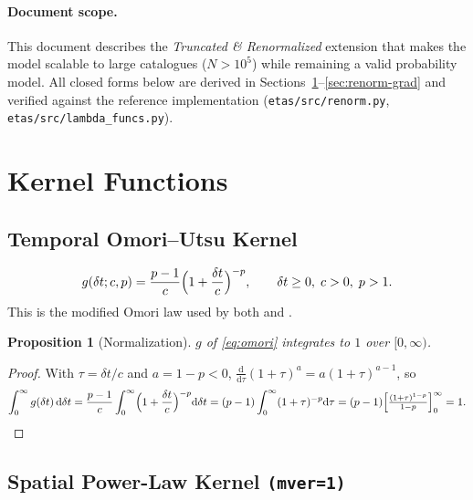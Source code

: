 \documentclass[11pt,a4paper]{article}
\theoremstyle{plain}
\newtheorem{proposition}{Proposition}
\theoremstyle{definition}
\newcommand{\dt}{\delta t}
\newcommand{\dd}{\mathrm{d}}
\begin{document}
\paragraph{Document scope.}
This document describes the \emph{Truncated \& Renormalized} extension that
makes the model scalable to large catalogues ($N>10^5$) while remaining a
valid probability model. All closed forms below are derived in
Sections~\ref{sec:kernels}--\ref{sec:renorm-grad} and verified against the
reference implementation (\texttt{etas/src/renorm.py},
\texttt{etas/src/lambda\_funcs.py}).

\section{Kernel Functions}\label{sec:kernels}

\subsection{Temporal Omori--Utsu Kernel}\label{sec:omori}

\begin{equation}\label{eq:omori}
g(\dt; c,p) = \frac{p-1}{c}\Bigl(1+\frac{\dt}{c}\Bigr)^{-p},
\qquad \dt\ge 0,\; c>0,\; p>1.
\end{equation}
This is the modified Omori law used by both \cite{J19} and \cite{GZZ15}.

\begin{proposition}[Normalization]\label{prop:omori-norm}
$g$ of \eqref{eq:omori} integrates to $1$ over $[0,\infty)$.
\end{proposition}
\begin{proof}
With $\tau=\dt/c$ and $a=1-p<0$,
$\frac{\dd}{\dd\tau}(1+\tau)^a = a(1+\tau)^{a-1}$, so
\[
\int_0^\infty g(\dt)\,\dd\dt
= \frac{p-1}{c}\int_0^\infty\Bigl(1+\frac{\dt}{c}\Bigr)^{-p}\dd\dt
= (p-1)\int_0^\infty(1+\tau)^{-p}\dd\tau
= (p-1)\Bigl[\tfrac{(1+\tau)^{1-p}}{1-p}\Bigr]_0^\infty
= 1. \qedhere
\]
\end{proof}

\subsection{Spatial Power-Law Kernel \texttt{(mver=1)}}\label{sec:pl-kernel}
\end{document}

